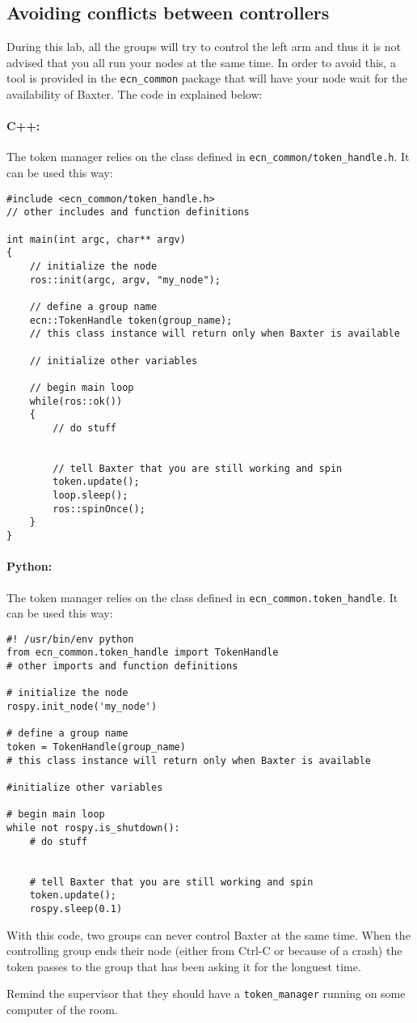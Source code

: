 \documentclass{ecnreport}
\begin{document}
 \subsection{Avoiding conflicts between controllers}
 
 During this lab, all the groups will try to control the left arm and thus it is not advised
 that you all run your nodes at the same time. In order to avoid this, a tool is provided in the  \texttt{ecn\_common}
 package that will have your node wait for the availability of Baxter. The code in explained below:
 
 \paragraph{C++: } The token manager relies on the class defined in \texttt{ecn\_common/token\_handle.h}. It can be used this way:
\cppstyle \begin{lstlisting}
#include <ecn_common/token_handle.h>
// other includes and function definitions

int main(int argc, char** argv)
{
    // initialize the node
    ros::init(argc, argv, "my_node");

    // define a group name
    ecn::TokenHandle token(group_name);
    // this class instance will return only when Baxter is available
    
    // initialize other variables

    // begin main loop
    while(ros::ok())
    {
        // do stuff
        

        // tell Baxter that you are still working and spin
        token.update();
        loop.sleep();
        ros::spinOnce();
    }
}
\end{lstlisting}


 \paragraph{Python: } The token manager relies on the class defined in \texttt{ecn\_common.token\_handle}. It can be used this way:
\pythonstyle \begin{lstlisting}
#! /usr/bin/env python
from ecn_common.token_handle import TokenHandle
# other imports and function definitions

# initialize the node
rospy.init_node('my_node')

# define a group name
token = TokenHandle(group_name)
# this class instance will return only when Baxter is available

#initialize other variables

# begin main loop
while not rospy.is_shutdown():
    # do stuff
    
    
    # tell Baxter that you are still working and spin
    token.update();
    rospy.sleep(0.1)

\end{lstlisting}
With this code, two groups can never control Baxter at the same time. When the controlling group ends their node (either from Ctrl-C or because of a crash) the token
passes to the group that has been asking it for the longuest time.

Remind the supervisor that they should have a \texttt{token\_manager} running on some computer of the room.
\end{document}
